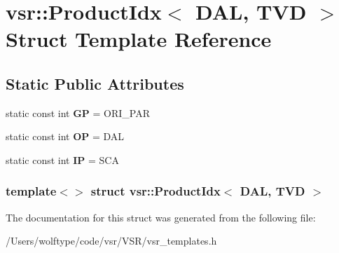 \hypertarget{structvsr_1_1_product_idx_3_01_d_a_l_00_01_t_v_d_01_4}{\section{vsr\-:\-:Product\-Idx$<$ D\-A\-L, T\-V\-D $>$ Struct Template Reference}
\label{structvsr_1_1_product_idx_3_01_d_a_l_00_01_t_v_d_01_4}
}
\subsection*{Static Public Attributes}
\begin{DoxyCompactItemize}
\item 
\hypertarget{structvsr_1_1_product_idx_3_01_d_a_l_00_01_t_v_d_01_4_ad62fed437e5e56cbb7b7664a5da44bd7}{static const int {\bfseries G\-P} = O\-R\-I\-\_\-\-P\-A\-R}\label{structvsr_1_1_product_idx_3_01_d_a_l_00_01_t_v_d_01_4_ad62fed437e5e56cbb7b7664a5da44bd7}

\item 
\hypertarget{structvsr_1_1_product_idx_3_01_d_a_l_00_01_t_v_d_01_4_ae044a17644668bec07bb54df557d8c74}{static const int {\bfseries O\-P} = D\-A\-L}\label{structvsr_1_1_product_idx_3_01_d_a_l_00_01_t_v_d_01_4_ae044a17644668bec07bb54df557d8c74}

\item 
\hypertarget{structvsr_1_1_product_idx_3_01_d_a_l_00_01_t_v_d_01_4_a0640757abd82c1ecc505d9a89cebcc69}{static const int {\bfseries I\-P} = S\-C\-A}\label{structvsr_1_1_product_idx_3_01_d_a_l_00_01_t_v_d_01_4_a0640757abd82c1ecc505d9a89cebcc69}

\end{DoxyCompactItemize}
\subsubsection*{template$<$$>$ struct vsr\-::\-Product\-Idx$<$ D\-A\-L, T\-V\-D $>$}



The documentation for this struct was generated from the following file\-:\begin{DoxyCompactItemize}
\item 
/\-Users/wolftype/code/vsr/\-V\-S\-R/vsr\-\_\-templates.\-h\end{DoxyCompactItemize}
